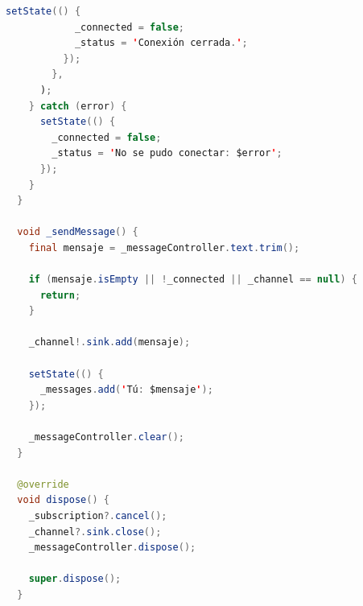 \begin{lstlisting}[language=Java, caption={Código completo de websocket\_test\_page.dart}]
          setState(() {
            _connected = false;
            _status = 'Conexión cerrada.';
          });
        },
      );
    } catch (error) {
      setState(() {
        _connected = false;
        _status = 'No se pudo conectar: $error';
      });
    }
  }

  void _sendMessage() {
    final mensaje = _messageController.text.trim();

    if (mensaje.isEmpty || !_connected || _channel == null) {
      return;
    }

    _channel!.sink.add(mensaje);

    setState(() {
      _messages.add('Tú: $mensaje');
    });

    _messageController.clear();
  }

  @override
  void dispose() {
    _subscription?.cancel();
    _channel?.sink.close();
    _messageController.dispose();

    super.dispose();
  }


\end{lstlisting}
